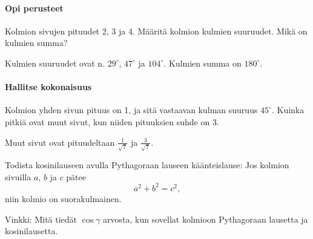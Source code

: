 \paragraph*{Opi perusteet}

\begin{tehtava}
Kolmion sivujen pituudet 2, 3 ja 4. Määritä kolmion kulmien suuruudet. Mikä on kulmien summa?
\begin{vastaus}
Kulmien suuruudet ovat n. $29^\circ$, $47^\circ$ ja $104^\circ$. Kulmien summa on $180^\circ$.
\end{vastaus}
\end{tehtava}

\paragraph*{Hallitse kokonaisuus}

\begin{tehtava}
Kolmion yhden sivun pituus on 1, ja sitä vastaavan kulman suuruus $45^\circ$. Kuinka pitkiä ovat muut sivut, kun niiden pituuksien suhde on 3.

\begin{vastaus}
Muut sivut ovat pituudeltaan $\frac{1}{\sqrt{7}}$ ja $\frac{3}{\sqrt{7}}$.
\end{vastaus}
\end{tehtava}

\begin{tehtava}
Todista kosinilauseen avulla Pythagoraan lauseen käänteislause: Jos kolmion sivuilla $a$, $b$ ja $c$ pätee
\[
a^2+b^2 = c^2,
\]
niin kolmio on suorakulmainen.

\begin{vastaus}
Vinkki: Mitä tiedät $\cos \gamma$ arvosta, kun sovellat kolmioon Pythagoraan lausetta ja kosinilausetta.
\end{vastaus}
\end{tehtava}

